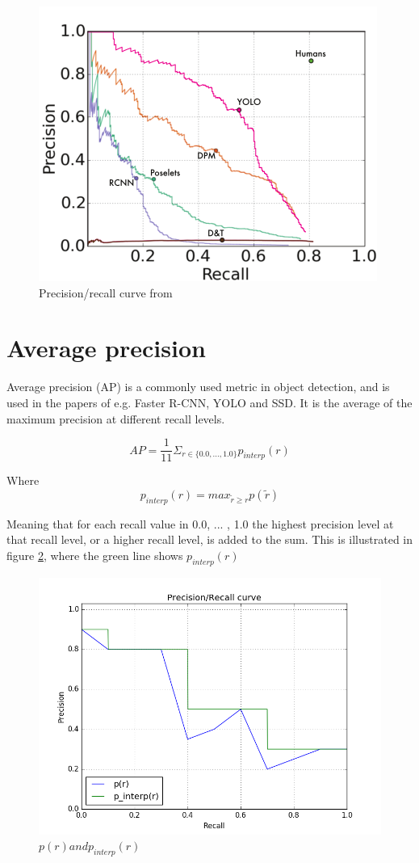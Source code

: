\begin{figure}[h!]
    \centering
    \includegraphics[scale=0.4]{fig/yolo_prec_recall.png} 
    \caption{Precision/recall curve from \citep{YOLOv1}}
    \label{fig:yolo_prec_recall}
\end{figure}

\section{Average precision}
Average precision (AP) is a commonly used metric in object detection, and is used in the papers of e.g. Faster R-CNN, YOLO and SSD. It is the average of the maximum precision at different recall levels.

\begin{equation}
    AP = \frac{1}{11} \Sigma_{r \in \{0.0, ... , 1.0\}} p_{interp}(r)
\end{equation}

Where
\begin{equation}
    p_{interp}(r) = max_{\tilde{r} \geq r} p(\tilde{r})
\end{equation}

Meaning that for each recall value in {0.0, ... , 1.0} the highest precision level at that recall level, or a higher recall level, is added to the sum. This is illustrated in figure \ref{fig:p_interp}, where the green line shows $p_{interp}(r)$

\begin{figure}[h!]
    \centering
    \includegraphics[scale=0.6]{fig/p_interp.png}
    \caption{$p(r) and p_{interp}(r)$}
    \label{fig:p_interp}
\end{figure}




\cleardoublepage